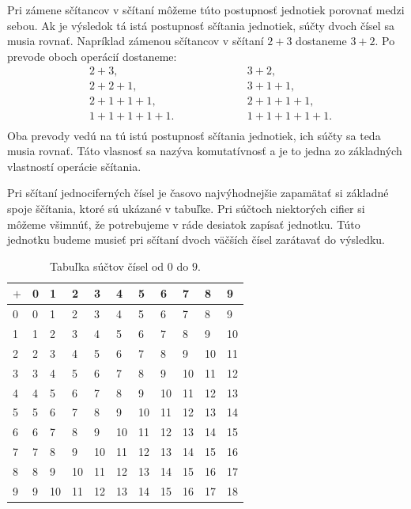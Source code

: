 \documentclass{article}
\begin{document}
Pri zámene sčítancov v sčítaní môžeme túto postupnosť jednotiek porovnať medzi sebou. Ak je výsledok tá istá postupnosť sčítania jednotiek, súčty dvoch čísel sa musia rovnať. Napríklad zámenou sčítancov v sčítaní \(2 + 3\) dostaneme \(3 + 2\). Po prevode oboch operácií dostaneme:
\[
\begin{aligned}
  &2 + 3, \\
  &2 + 2 + 1, \\
  &2 + 1 + 1 + 1, \\
  &1 + 1 + 1 + 1 + 1. \\
\end{aligned}
\hspace{5em}
\begin{aligned}
  &3 + 2, \\
  &3 + 1 + 1, \\
  &2 + 1 + 1 + 1, \\
  &1 + 1 + 1 + 1 + 1. \\
\end{aligned}
\]
Oba prevody vedú na tú istú postupnosť sčítania jednotiek, ich súčty sa teda musia rovnať. Táto vlasnosť sa nazýva komutatívnosť a je to jedna zo základných vlastností operácie sčítania.

Pri sčítaní jednociferných čísel je časovo najvýhodnejšie zapamätať si základné spoje ščítania, ktoré sú ukázané v tabuľke. Pri súčtoch niektorých cifier si môžeme všimnúť, že potrebujeme v ráde desiatok zapísať jednotku. Túto jednotku budeme musieť pri sčítaní dvoch väčších čísel zarátavať do výsledku.
\begin{table}[H]
  \centering
  \renewcommand{\arraystretch}{1.3}
  \begin{tabular}{C|CCCCCCCCCC}
    \(+\) & 0 & 1 & 2 & 3 & 4 & 5 & 6 & 7 & 8 & 9 \\
     & 0 & 1 & 2 & 3 & 4 & 5 & 6 & 7 & 8 & 9 \\
    1 & 1 & 2 & 3 & 4 & 5 & 6 & 7 & 8 & 9 & 10 \\
    2 & 2 & 3 & 4 & 5 & 6 & 7 & 8 & 9 & 10 & 11 \\
    3 & 3 & 4 & 5 & 6 & 7 & 8 & 9 & 10 & 11 & 12 \\
    4 & 4 & 5 & 6 & 7 & 8 & 9 & 10 & 11 & 12 & 13 \\
    5 & 5 & 6 & 7 & 8 & 9 & 10 & 11 & 12 & 13 & 14 \\
    6 & 6 & 7 & 8 & 9 & 10 & 11 & 12 & 13 & 14 & 15 \\
    7 & 7 & 8 & 9 & 10 & 11 & 12 & 13 & 14 & 15 & 16 \\
    8 & 8 & 9 & 10 & 11 & 12 & 13 & 14 & 15 & 16 & 17 \\
    9 & 9 & 10 & 11 & 12 & 13 & 14 & 15 & 16 & 17 & 18 \\
  \end{tabular}
  \caption{Tabuľka súčtov čísel od \(0\) do \(9\).}
\end{table}
\end{document}
